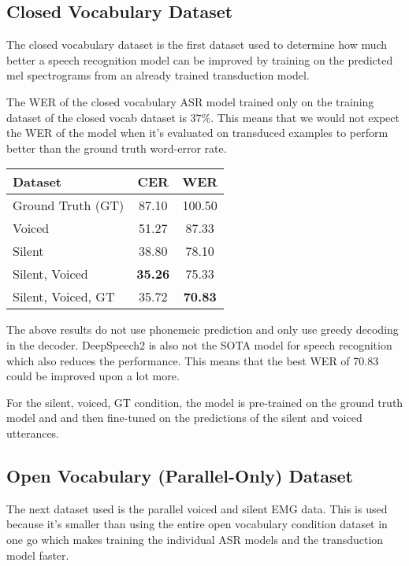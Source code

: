 \subsection{Closed Vocabulary Dataset}

The closed vocabulary dataset is the first dataset used to determine how much better
a speech recognition model can be improved by training on the predicted mel spectrograms
from an already trained transduction model.

The WER of the closed vocabulary ASR model trained only on the training dataset
of the closed vocab dataset is 37\%. This means that we would not expect the WER
of the model when it's evaluated on transduced examples to perform better than
the ground truth word-error rate.

{\small\begin{center}
\begin{tabular} {  l  c  c  }
\hline
\textbf{Dataset} & \textbf{CER} & \textbf{WER} \\
\hline
Ground Truth (GT) & 87.10 & 100.50 \\
Voiced & 51.27 & 87.33 \\
Silent & 38.80 & 78.10 \\
Silent, Voiced & \textbf{35.26} & 75.33 \\
\hline
Silent, Voiced, GT & 35.72 & \textbf{70.83} \\
\hline
\end{tabular}
\end{center}}

The above results do not use phonemeic prediction and only use greedy decoding
in the decoder. DeepSpeech2 is also not the SOTA model for speech recognition
which also reduces the performance. This means that the best WER of 70.83 could
be improved upon a lot more.

For the silent, voiced, GT condition, the model is pre-trained on the
ground truth model and and then fine-tuned on the predictions of the
silent and voiced utterances.

\subsection{Open Vocabulary (Parallel-Only) Dataset}

The next dataset used is the parallel voiced and silent EMG data. This is used because
it's smaller than using the entire open vocabulary condition dataset in one go which
makes training the individual ASR models and the transduction model faster.

